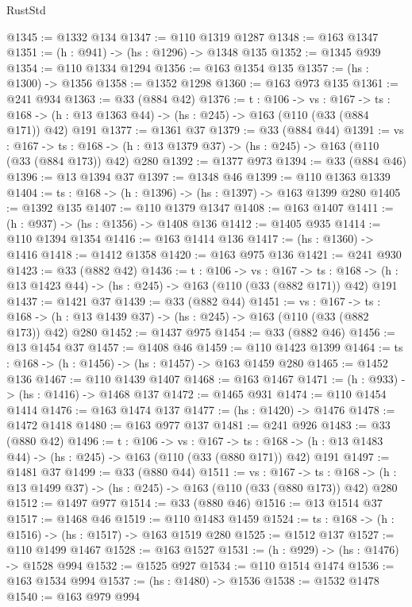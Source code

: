 \begin{lexlean}{RustStd}
\begin{coremodule}
@1345 := @1332 @134
@1347 := @110 @1319 @1287
@1348 := @163 @1347
@1351 := (h : @941) -> (hs : @1296) -> @1348 @135
@1352 := @1345 @939
@1354 := @110 @1334 @1294
@1356 := @163 @1354 @135
@1357 := (hs : @1300) -> @1356
@1358 := @1352 @1298
@1360 := @163 @973 @135
@1361 := @241 @934
@1363 := @33 (@884 @42)
@1376 := {t : @106} ->
  {vs : @167} ->
  {ts : @168} -> (h : @13 @1363 @44) -> (hs : @245) -> @163 (@110 (@33 (@884 @171)) @42) @191
@1377 := @1361 @37
@1379 := @33 (@884 @44)
@1391 := {vs : @167} ->
  {ts : @168} -> (h : @13 @1379 @37) -> (hs : @245) -> @163 (@110 (@33 (@884 @173)) @42) @280
@1392 := @1377 @973
@1394 := @33 (@884 @46)
@1396 := @13 @1394 @37
@1397 := @1348 @46
@1399 := @110 @1363 @1339
@1404 := {ts : @168} -> (h : @1396) -> (hs : @1397) -> @163 @1399 @280
@1405 := @1392 @135
@1407 := @110 @1379 @1347
@1408 := @163 @1407
@1411 := (h : @937) -> (hs : @1356) -> @1408 @136
@1412 := @1405 @935
@1414 := @110 @1394 @1354
@1416 := @163 @1414 @136
@1417 := (hs : @1360) -> @1416
@1418 := @1412 @1358
@1420 := @163 @975 @136
@1421 := @241 @930
@1423 := @33 (@882 @42)
@1436 := {t : @106} ->
  {vs : @167} ->
  {ts : @168} -> (h : @13 @1423 @44) -> (hs : @245) -> @163 (@110 (@33 (@882 @171)) @42) @191
@1437 := @1421 @37
@1439 := @33 (@882 @44)
@1451 := {vs : @167} ->
  {ts : @168} -> (h : @13 @1439 @37) -> (hs : @245) -> @163 (@110 (@33 (@882 @173)) @42) @280
@1452 := @1437 @975
@1454 := @33 (@882 @46)
@1456 := @13 @1454 @37
@1457 := @1408 @46
@1459 := @110 @1423 @1399
@1464 := {ts : @168} -> (h : @1456) -> (hs : @1457) -> @163 @1459 @280
@1465 := @1452 @136
@1467 := @110 @1439 @1407
@1468 := @163 @1467
@1471 := (h : @933) -> (hs : @1416) -> @1468 @137
@1472 := @1465 @931
@1474 := @110 @1454 @1414
@1476 := @163 @1474 @137
@1477 := (hs : @1420) -> @1476
@1478 := @1472 @1418
@1480 := @163 @977 @137
@1481 := @241 @926
@1483 := @33 (@880 @42)
@1496 := {t : @106} ->
  {vs : @167} ->
  {ts : @168} -> (h : @13 @1483 @44) -> (hs : @245) -> @163 (@110 (@33 (@880 @171)) @42) @191
@1497 := @1481 @37
@1499 := @33 (@880 @44)
@1511 := {vs : @167} ->
  {ts : @168} -> (h : @13 @1499 @37) -> (hs : @245) -> @163 (@110 (@33 (@880 @173)) @42) @280
@1512 := @1497 @977
@1514 := @33 (@880 @46)
@1516 := @13 @1514 @37
@1517 := @1468 @46
@1519 := @110 @1483 @1459
@1524 := {ts : @168} -> (h : @1516) -> (hs : @1517) -> @163 @1519 @280
@1525 := @1512 @137
@1527 := @110 @1499 @1467
@1528 := @163 @1527
@1531 := (h : @929) -> (hs : @1476) -> @1528 @994
@1532 := @1525 @927
@1534 := @110 @1514 @1474
@1536 := @163 @1534 @994
@1537 := (hs : @1480) -> @1536
@1538 := @1532 @1478
@1540 := @163 @979 @994

\end{coremodule}
\end{lexlean}
